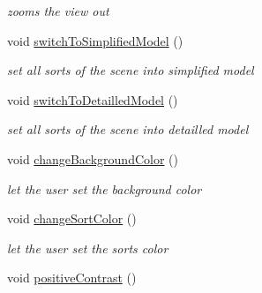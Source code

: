 \begin{DoxyCompactItemize}
\begin{DoxyCompactList}\small\item\em zooms the view out \end{DoxyCompactList}\item 
\hypertarget{classMainWindow_a70de6a437bf79b2e94bfeb24e7207592}{void \hyperlink{classMainWindow_a70de6a437bf79b2e94bfeb24e7207592}{switch\+To\+Simplified\+Model} ()}\label{classMainWindow_a70de6a437bf79b2e94bfeb24e7207592}

\begin{DoxyCompactList}\small\item\em set all sorts of the scene into simplified model \end{DoxyCompactList}\item 
\hypertarget{classMainWindow_a08da9d2c3f6beb57e2172fe02fa08e6e}{void \hyperlink{classMainWindow_a08da9d2c3f6beb57e2172fe02fa08e6e}{switch\+To\+Detailled\+Model} ()}\label{classMainWindow_a08da9d2c3f6beb57e2172fe02fa08e6e}

\begin{DoxyCompactList}\small\item\em set all sorts of the scene into detailled model \end{DoxyCompactList}\item 
\hypertarget{classMainWindow_a1a7e2b9194e7134bca5fcf1dd4842a07}{void \hyperlink{classMainWindow_a1a7e2b9194e7134bca5fcf1dd4842a07}{change\+Background\+Color} ()}\label{classMainWindow_a1a7e2b9194e7134bca5fcf1dd4842a07}

\begin{DoxyCompactList}\small\item\em let the user set the background color \end{DoxyCompactList}\item 
\hypertarget{classMainWindow_a608f0b442dc8d0e1c68807b1955d5182}{void \hyperlink{classMainWindow_a608f0b442dc8d0e1c68807b1955d5182}{change\+Sort\+Color} ()}\label{classMainWindow_a608f0b442dc8d0e1c68807b1955d5182}

\begin{DoxyCompactList}\small\item\em let the user set the sorts color \end{DoxyCompactList}\item 
\hypertarget{classMainWindow_a53a978130fe29018994d68086887cec6}{void \hyperlink{classMainWindow_a53a978130fe29018994d68086887cec6}{positive\+Contrast} ()}\label{classMainWindow_a53a978130fe29018994d68086887cec6}


\end{DoxyCompactItemize}
